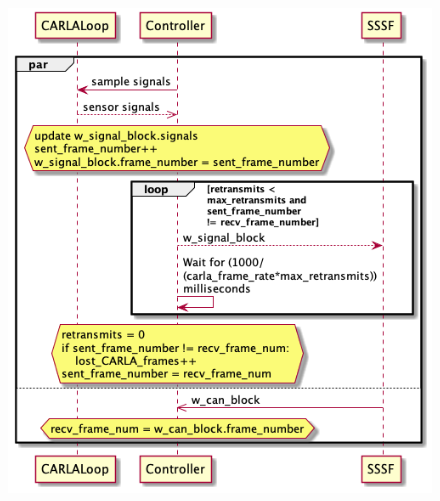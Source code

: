 \documentclass[letterpaper,twocolumn,12pt]{article}
\begin{document}
\begin{figure}[t!]
    \centering
    \includegraphics[width=\linewidth]{out/images/signal_control/signal_control.png}
    \caption{}
    \label{fig:}
\end{figure}
\end{document}
